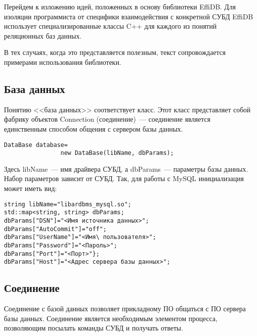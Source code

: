 \begin{multicols}{2}
Перейдем к изложению идей, положенных в основу библиотеки EffiDB. Для изоляции 
программиста от специфики взаимодействия с конкретной СУБД EffiDB использует 
специализированные классы C++ для каждого из понятий реляционных баз данных.

В тех случаях, когда это представляется полезным, текст сопровождается примерами 
использования библиотеки.

\vspace*{-6pt}

\subsection{База данных} %

\vspace*{-1pt}

Понятию <<база данных>> соответствует класс. 
Этот класс представляет 
собой фабрику объектов Connection (соединение)~--- соединение является единственным 
способом общения с сервером базы данных. 
{\small
\begin{verbatim}
DataBase database=
                new DataBase(libName, dbParams);
\end{verbatim}}

\noindent
Здесь {\sf libName}~--- имя драйвера СУБД, а {\sf dbParams}~--- параметры базы данных. Набор 
параметров зависит от СУБД. Так, для работы с MySQL инициализация может иметь вид:
{\small
\begin{verbatim}
string libName="libardbms_mysql.so";
std::map<string, string> dbParams;
dbParams["DSN"]="<Имя источника данных>";
dbParams["AutoCommit"]="off";
dbParams["UserName"]="<Имя\ пользователя>";
dbParams["Password"]="<Пароль>";
dbParams["Port"]="<Порт>"};
dbParams["Host"]="<Адрес сервера базы данных>";
\end{verbatim}}

\vspace*{-6pt}

\subsection{Соединение} %

Соединение с базой данных позволяет прикладному ПО
общаться с ПО сервера базы данных. Соединение является 
необходимым элементом процесса, позволяющим посылать команды СУБД и получать 
ответы.


\end{multicols}
